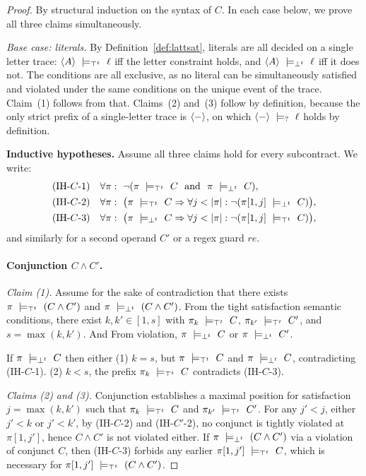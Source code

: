 \begin{proof}
By structural induction on the syntax of $C$. In each case below, we prove all three claims simultaneously.

\smallskip
\emph{Base case: literals.}
By Definition~\ref{def:lattsat}, literals are all decided on a single letter trace:
$\trace{A}\ \satt\ \ell$ iff the letter constraint holds, and
$\langle A \rangle \ \models_{\bot^t}\ \ell$ iff it does not. The conditions are all exclusive, as no literal can be simultaneously satisfied and violated under the same conditions on the unique event of the trace. Claim~(1) follows from that.
Claims~(2) and~(3) follow by definition, because the only strict prefix of a single-letter trace is $\langle - \rangle $, on which $\langle - \rangle \ \models_{?}\ \ell$ holds by definition.

\medskip
\noindent\textbf{Inductive hypotheses.}
Assume all three claims hold for every subcontract. We write:
\[
\begin{aligned}
\text{(IH-$C$-1)}\quad
&\forall\pi:\  \neg(\pi\ \satt\ C\ \nd\ \pi\ \violt\ C),\\
\text{(IH-$C$-2)}\quad
&\forall\pi:\  \bigl(\pi\ \satt\ C \Rightarrow \forall j<|\pi|:\neg(\pi[1,j]\ \violt\ C)\bigr),\\
\text{(IH-$C$-3)}\quad
&\forall\pi:\  \bigl(\pi\ \violt\ C \Rightarrow \forall j<|\pi|:\neg(\pi[1,j]\ \satt\ C)\bigr),
\end{aligned}
\]
and similarly for a second operand $C'$ or a regex guard $re$.

\paragraph{Conjunction $C\wedge C'$.}
\emph{Claim (1).}
Assume for the sake of contradiction that there exists $\pi\ \models_{\top^t}\ (C\wedge C')$ and $\pi\ \violt\ (C\wedge C')$.
From the tight satisfaction semantic conditions, there exist $k,k'\in[1,s]$ with $\pi_k\ \models_{\top^t}\ C$, $\pi_{k'}\ \models_{\top^t}\ C'$, and $s=\max(k,k')$. And From violation, $\pi\ \models_{\bot^t}\ C$ or $\pi\ \models_{\bot^t}\ C'$.


If $\pi\ \models_{\bot^t}\ C$ then either (1) $k=s$, but $\pi\ \models_{\top^t}\ C$ and $\pi\ \models_{\bot^t}\ C$, contradicting (IH-$C$-1). (2) $k<s$, the prefix $\pi_k\ \models_{\top^t}\ C$ contradicts (IH-$C$-3).

\emph{Claims (2) and (3).}
Conjunction establishes a maximal position for satisfaction $j = \max(k,k')$ such that $\pi_k\ \models_{\top^t}\ C$ and $\pi_{k'}\ \models_{\top^t}\ C'$.
For any $j' < j$, either $j' < k$ or $j' < k'$, by (IH-$C$-2) and (IH-$C'$-2), no conjunct is tightly violated at $\pi[1,j']$, hence $C\wedge C'$ is not violated either.
If $\pi\ \violt\ (C\wedge C')$ via a violation of conjunct $C$, then (IH-$C$-3) forbids any earlier $\pi[1,j']\ \satt\ C$, which is necessary for $\pi[1,j']\ \satt\ (C\wedge C')$.


\end{proof}
